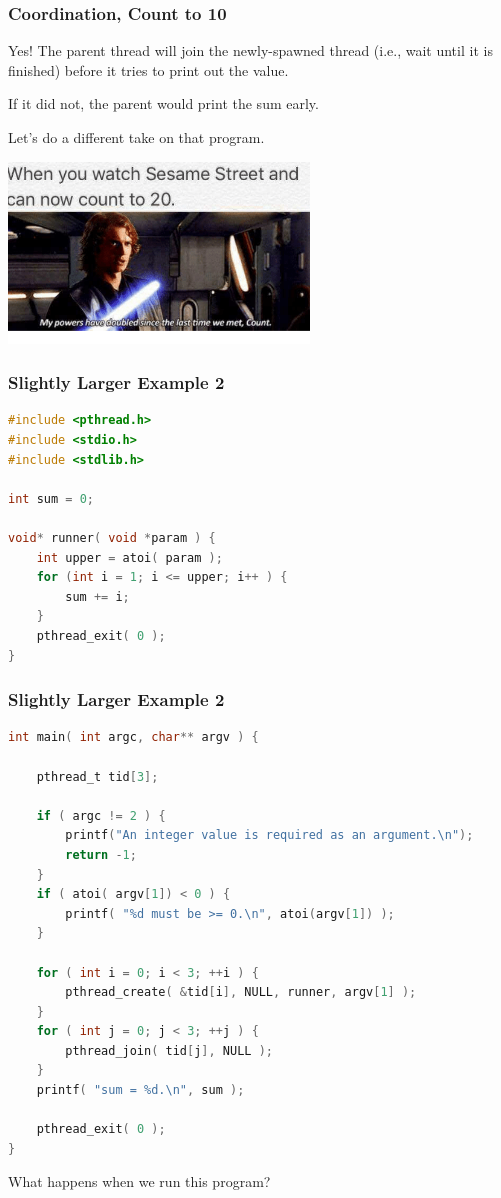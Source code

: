 \begin{frame}
	\frametitle{Coordination, Count to 10}
	Yes! The parent thread will join the newly-spawned thread (i.e., wait until it is finished) before it tries to print out the value.

	If it did not, the parent would print the sum early.

	Let's do a different take on that program.

	\begin{center}
		\includegraphics[width=0.6\textwidth]{images/sesamestreet.png}
	\end{center}

\end{frame}

\begin{frame}[fragile]
	\frametitle{Slightly Larger Example 2}

	\begin{lstlisting}[language=C]
#include <pthread.h>
#include <stdio.h>
#include <stdlib.h>

int sum = 0;

void* runner( void *param ) {
    int upper = atoi( param );
    for (int i = 1; i <= upper; i++ ) {
        sum += i;
    }
    pthread_exit( 0 );
}
\end{lstlisting}


\end{frame}

\begin{frame}[fragile]
	\frametitle{Slightly Larger Example 2}


	\begin{lstlisting}[language=C]
int main( int argc, char** argv ) {

    pthread_t tid[3];

    if ( argc != 2 ) {
        printf("An integer value is required as an argument.\n");
        return -1;
    }
    if ( atoi( argv[1]) < 0 ) {
        printf( "%d must be >= 0.\n", atoi(argv[1]) );
    }

    for ( int i = 0; i < 3; ++i ) {
        pthread_create( &tid[i], NULL, runner, argv[1] );
    }
    for ( int j = 0; j < 3; ++j ) {
        pthread_join( tid[j], NULL );
    }
    printf( "sum = %d.\n", sum );

    pthread_exit( 0 );
}
\end{lstlisting}

	What happens when we run this program?

\end{frame}


